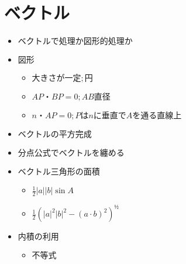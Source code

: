 \documentclass[dvipdfmx,uplatex]{jsarticle}
\begin{document}
\section{ベクトル}
\begin{itemize}
	\item $ ベクトルで処理か図形的処理か$
	\item $ 図形$
	\begin{itemize}
		\item $ 大きさが一定;円$
		\item $ AP・BP = 0 ;AB直径$
		\item $ n・AP = 0 ;Pはnに垂直でAを通る直線上$
	\end{itemize}
	\item $ ベクトルの平方完成$
	\item $ 分点公式でベクトルを纏める$
	\item $ ベクトル三角形の面積$
	\begin{itemize}
		\item $ \frac{1}{2}|a||b| \sin A$
		\item $ \frac{1}{2}(|a|^2|b|^2 - (a \cdot b)^2)^{½}$
	\end{itemize}
	\item $ 内積の利用$
	\begin{itemize}
		\item $ 不等式$
	\end{itemize}
\end{itemize}
\end{document}
